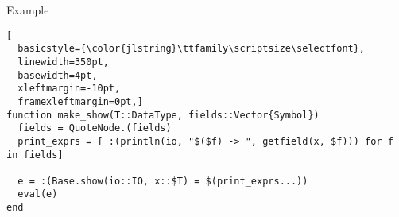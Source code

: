\documentclass[14pt]{beamer}
\begin{document}
\begin{frame}[fragile]{Example}

\begin{lstlisting}[
  basicstyle={\color{jlstring}\ttfamily\scriptsize\selectfont},
  linewidth=350pt,
  basewidth=4pt,
  xleftmargin=-10pt,
  framexleftmargin=0pt,]
function make_show(T::DataType, fields::Vector{Symbol})
  fields = QuoteNode.(fields)
  print_exprs = [ :(println(io, "$($f) -> ", getfield(x, $f))) for f in fields]

  e = :(Base.show(io::IO, x::$T) = $(print_exprs...))
  eval(e)
end
\end{lstlisting}
\end{frame}
\end{document}

